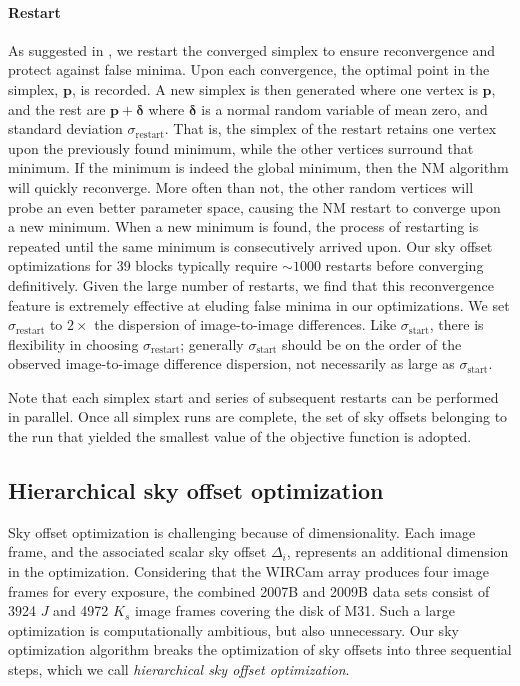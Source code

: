 \documentclass[iop]{emulateapj}
\newcommand{\vect}[1]{\boldsymbol{#1}} %
\begin{document}
\paragraph{Restart} As suggested in \cite{Press:2007}, we restart the converged simplex to ensure reconvergence and protect against false minima.
Upon each convergence, the optimal point in the simplex, $\vect{p}$, is recorded.
A new simplex is then generated where one vertex is $\vect{p}$, and the rest are $\vect{p}+\vect{\delta}$ where $\vect{\delta}$ is a normal random variable of mean zero, and standard deviation $\sigma_\mathrm{restart}$.
That is, the simplex of the restart retains one vertex upon the previously found minimum, while the other vertices surround that minimum.
If the minimum is indeed the global minimum, then the NM algorithm will quickly reconverge.
More often than not, the other random vertices will probe an even better parameter space, causing the NM restart to converge upon a new minimum.
When a new minimum is found, the process of restarting is repeated until the same minimum is consecutively arrived upon.
Our sky offset optimizations for 39 blocks typically require $\sim1000$ restarts before converging definitively.
Given the large number of restarts, we find that this reconvergence feature is extremely effective at eluding false minima in our optimizations.
We set $\sigma_\mathrm{restart}$ to $2\times$ the dispersion of image-to-image differences.
Like $\sigma_\mathrm{start}$, there is flexibility in choosing $\sigma_\mathrm{restart}$; generally $\sigma_\mathrm{start}$ should be on the order of the observed image-to-image difference dispersion, not necessarily as large as $\sigma_\mathrm{start}$.

Note that each simplex start and series of subsequent restarts can be performed in parallel.
Once all simplex runs are complete, the set of sky offsets belonging to the run that yielded the smallest value of the objective function is adopted.

\subsection{Hierarchical sky offset optimization}
\label{sec:hierarchical_algo}

Sky offset optimization is challenging because of dimensionality.
Each image frame, and the associated scalar sky offset $\Delta_i$, represents an additional dimension in the optimization.
Considering that the WIRCam array produces four image frames for every exposure, the combined 2007B and 2009B data sets consist of 3924 $J$ and 4972 $K_s$ image frames covering the disk of M31.
Such a large optimization is computationally ambitious, but also unnecessary.
Our sky optimization algorithm breaks the optimization of sky offsets into three sequential steps, which we call \emph{hierarchical sky offset optimization}.
\end{document}
